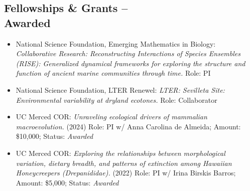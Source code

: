\documentclass[margin,line,12pt]{res}
\begin{document}
\begin{resume}





\section{\sc Fellowships \& Grants -- \\ Awarded}
\begin{itemize}
\item National Science Foundation, Emerging Mathematics in Biology: \emph{Collaborative Research: Reconstructing Interactions of Species Ensembles (RISE): Generalized dynamical frameworks for exploring the structure and function of ancient marine communities through time.} Role: PI


\item National Science Foundation, LTER Renewel: \emph{LTER: Sevilleta Site: Environmental variability at dryland ecotones.} Role: Collaborator

\item UC Merced COR: \emph{Unraveling ecological drivers of mammalian macroevolution.} (2024) Role: PI w/ Anna Carolina de Almeida; Amount: \$10,000; Status: \emph{Awarded}

\item UC Merced COR: \emph{Exploring the relationships between morphological variation, dietary breadth, and patterns of extinction among Hawaiian Honeycreepers (Drepanididae).} (2022) Role: PI w/ Irina Birskis Barros; Amount: \$5,000; Status: \emph{Awarded}
  

\end{itemize}
\end{resume}
\end{document}
